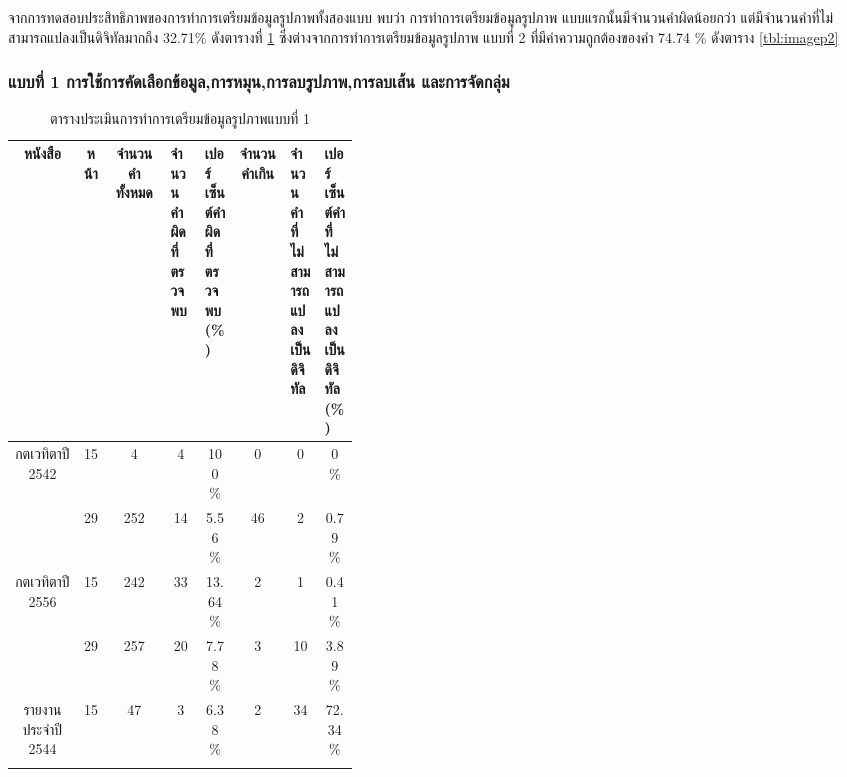 จากการทดสอบประสิทธิภาพของการทำการเตรียมข้อมูลรูปภาพทั้งสองแบบ พบว่า 
การทำการเตรียมข้อมูลรูปภาพ แบบแรกนั้นมีจำนวนคำผิดน้อยกว่า แต่มีจำนวนคำที่ไม่สามารถแปลงเป็นดิจิทัลมากถึง 
32.71\% ดังตารางที่ \ref{tbl:imagep1} ซึ่งต่างจากการทำการเตรียมข้อมูลรูปภาพ แบบที่ 2 ที่มีค่าความถูกต้องของคำ 
74.74 \% ดังตาราง \ref{tbl:imagep2}

\subsubsection{แบบที่ 1 การใช้การคัดเลือกข้อมูล,การหมุน,การลบรูปภาพ,การลบเส้น และการจัดกลุ่ม}
\begin{table}[H]
    \caption{ตารางประเมินการทำการเตรียมข้อมูลรูปภาพแบบที่ 1 }\label{tbl:imagep1}
    \begin{tabular}{|c|c|c|p{0.1\linewidth}|p{0.1\linewidth}|c|p{0.1\linewidth}|p{0.1\linewidth}|}
        \hline
        หนังสือ                             & หน้า  & จำนวนคำทั้งหมด & จำนวนคำผิดที่ตรวจพบ & เปอร์เซ็นต์คำผิดที่ตรวจพบ(\%)    & จำนวนคำเกิน & จำนวนคำที่ไม่สามารถแปลงเป็นดิจิทัล & เปอร์เซ็นต์คำที่ไม่สามารถแปลงเป็นดิจิทัล(\%)    \\ \hline
        \multirow{2}{*}{กตเวทิตาปี 2542}      & 15    & 4         & \multicolumn{1}{c|}{4  }         & \multicolumn{1}{c|}{100 \%  } & \multicolumn{1}{c|}{0  }    & \multicolumn{1}{c|}{0  }             & \multicolumn{1}{c|}{0 \%    }\\ \cline{2-8} 
                                            & 29    & 252       & \multicolumn{1}{c|}{14 }         & \multicolumn{1}{c|}{5.56 \% }  &\multicolumn{1}{c|}{46}     &\multicolumn{1}{c|}{2 }              &\multicolumn{1}{c|}{0.79 \%} \\ \hline
        \multirow{2}{*}{กตเวทิตาปี 2556}      & 15    & 242       & \multicolumn{1}{c|}{33 }         & \multicolumn{1}{c|}{13.64 \%}  &\multicolumn{1}{c|}{2 }     &\multicolumn{1}{c|}{1 }              &\multicolumn{1}{c|}{0.41 \%} \\ \cline{2-8} 
                                            & 29    & 257       & \multicolumn{1}{c|}{20 }         & \multicolumn{1}{c|}{7.78 \% } & \multicolumn{1}{c|}{3  }    & \multicolumn{1}{c|}{10 }             & \multicolumn{1}{c|}{3.89 \% }\\ \hline
        \multirow{2}{*}{รายงานประจำปี 2544}   & 15    & 47        & \multicolumn{1}{c|}{3  }         & \multicolumn{1}{c|}{6.38 \% } & \multicolumn{1}{c|}{2  }    & \multicolumn{1}{c|}{34 }             & \multicolumn{1}{c|}{72.34 \%} \\ \cline{2-8} 

\end{tabular}
\end{table}
